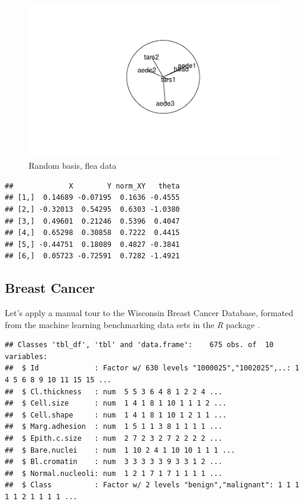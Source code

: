 \documentclass{monashthesis}
\begin{document}
\begin{figure}
\centering
\includegraphics{thesis_files/figure-latex/unnamed-chunk-2-1.pdf}
\caption{\label{fig:unnamed-chunk-2}Random basis, flea data}
\end{figure}

\begin{verbatim}
##             X        Y norm_XY   theta
## [1,]  0.14689 -0.07195  0.1636 -0.4555
## [2,] -0.32013  0.54295  0.6303 -1.0380
## [3,]  0.49601  0.21246  0.5396  0.4047
## [4,]  0.65298  0.30858  0.7222  0.4415
## [5,] -0.44751  0.18089  0.4827 -0.3841
## [6,]  0.05723 -0.72591  0.7282 -1.4921
\end{verbatim}

\subsection{Breast Cancer}\label{breast-cancer}

Let's apply a manual tour to the Wisconsin Breast Cancer Database,
formated from the machine learning benchmarking data sets in the
\emph{R} package \autocite{leisch_mlbench:_2010}.

\begin{verbatim}
## Classes 'tbl_df', 'tbl' and 'data.frame':    675 obs. of  10 variables:
##  $ Id             : Factor w/ 630 levels "1000025","1002025",..: 1 4 5 6 8 9 10 11 15 15 ...
##  $ Cl.thickness   : num  5 5 3 6 4 8 1 2 2 4 ...
##  $ Cell.size      : num  1 4 1 8 1 10 1 1 1 2 ...
##  $ Cell.shape     : num  1 4 1 8 1 10 1 2 1 1 ...
##  $ Marg.adhesion  : num  1 5 1 1 3 8 1 1 1 1 ...
##  $ Epith.c.size   : num  2 7 2 3 2 7 2 2 2 2 ...
##  $ Bare.nuclei    : num  1 10 2 4 1 10 10 1 1 1 ...
##  $ Bl.cromatin    : num  3 3 3 3 3 9 3 3 1 2 ...
##  $ Normal.nucleoli: num  1 2 1 7 1 7 1 1 1 1 ...
##  $ Class          : Factor w/ 2 levels "benign","malignant": 1 1 1 1 1 2 1 1 1 1 ...
\end{verbatim}
\end{document}
